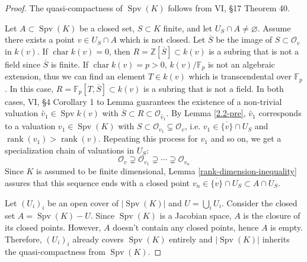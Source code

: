 \begin{proof}
The quasi-compactness of $\operatorname{Spv}(K)$ follows from \cite{ZS60} VI, §17 Theorem 40. 

Let $A\subset \operatorname{Spv}(K)$ be a closed set, $S\subset K$ finite, and let $U_S\cap A\neq\varnothing$. Assume there exists a point $v\in U_S\cap A$ which is not closed. Let $\overline{S}$ be the image of $S\subset \mathcal{O}_v$ in $k(v)$. If $\operatorname{char}k(v)=0$, then $R=\mathbb{Z}[\overline{S}]\subset k(v)$ is a subring that is not a field since $\overline{S}$ is finite. If $\operatorname{char} k(v)=p>0$, $k(v)/\mathbb{F}_p$ is not an algebraic extension, thus we can find an element $T\in k(v)$ which is transcendental over $\mathbb{F}_p$. In this case, $R=\mathbb{F}_p[T, \overline{S}]\subset k(v)$ is a subring that is not a field. In both cases, \cite{ZS60} VI, §4 Corollary 1 to Lemma guarantees the existence of a non-trivial valuation $\widetilde{v_1}\in\operatorname{Spv}k(v)$ with $\overline{S}\subset R\subset \mathcal{O}_{\widetilde{v_1}}$. By Lemma \ref{2.2-pre}, $\widetilde{v_1}$ corresponds to a valuation $v_1\in\operatorname{Spv}(K)$ with $S\subset \mathcal{O}_{v_1}\subsetneq \mathcal{O}_v$, i.e. $v_1\in \overline{\{v\}}\cap U_S$ and $\operatorname{rank}(v_1)>\operatorname{rank}(v)$. Repeating this process for $v_1$ and so on, we get a specialization chain of valuations in $U_S$:
\[\mathcal{O}_v\supsetneq \mathcal{O}_{v_1}\supsetneq\cdots \supsetneq\mathcal{O}_{v_n} \]
Since $K$ is assumed to be finite dimensional, Lemma \ref{rank-dimension-inequality} assures that this sequence ends with a closed point $v_n\in \overline{\{v\}}\cap U_S\subset A\cap U_S$.

Let $(U_i)_i$ be an open cover of $|\operatorname{Spv}(K)|$ and $U=\bigcup_i U_i$. Consider the closed set $A=\operatorname{Spv}(K)-U$. Since $\operatorname{Spv}(K)$ is a Jacobian space, $A$ is the closure of its closed points. However, $A$ doesn't contain any closed points, hence $A$ is empty. Therefore, $(U_i)_i$ already covers $\operatorname{Spv}(K)$ entirely and $|\operatorname{Spv}(K)|$ inherits the quasi-compactness from $\operatorname{Spv}(K)$.
\end{proof}

